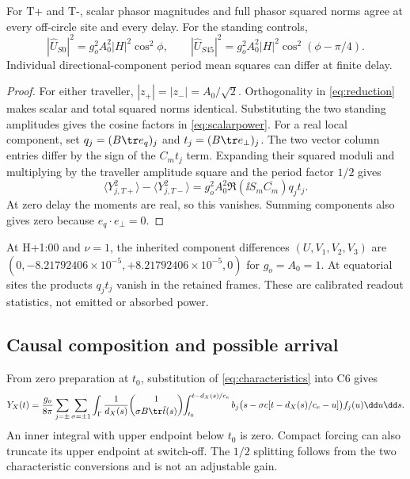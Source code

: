 \begin{proposition}\label{prop:power}
For T+ and T-, scalar phasor magnitudes and full phasor squared norms agree at every off-circle site and every delay. For the standing controls,
\begin{equation}\label{eq:scalarpower}
 |\widehat U_{S0}|^2=g_o^2A_0^2|H|^2\cos^2\phi,\qquad
 |\widehat U_{S45}|^2=g_o^2A_0^2|H|^2\cos^2(\phi-\pi/4).
\end{equation}
Individual directional-component period mean squares can differ at finite delay.
\end{proposition}
\begin{proof}
For either traveller, $|z_+|=|z_-|=A_0/\sqrt2$. Orthogonality in \eqref{eq:reduction} makes scalar and total squared norms identical. Substituting the two standing amplitudes gives the cosine factors in \eqref{eq:scalarpower}. For a real local component, set $q_j=(B\tr e_q)_j$ and $t_j=(B\tr e_\perp)_j$. The two vector column entries differ by the sign of the $C_mt_j$ term. Expanding their squared moduli and multiplying by the traveller amplitude square and the period factor $1/2$ gives
\begin{equation}\label{eq:componentpower}
 \langle Y_{j,T+}^2\rangle-\langle Y_{j,T-}^2\rangle
 =g_o^2A_0^2\Re(\ii S_m\overline{C_m})q_jt_j.
\end{equation}
At zero delay the moments are real, so this vanishes. Summing components also gives zero because $e_q\cdot e_\perp=0$.
\end{proof}
At H+1:00 and $\nu=1$, the inherited component differences $(U,V_1,V_2,V_3)$ are $(0,-8.21792406\times10^{-5},+8.21792406\times10^{-5},0)$ for $g_o=A_0=1$. At equatorial sites the products $q_jt_j$ vanish in the retained frames. These are calibrated readout statistics, not emitted or absorbed power.

\subsection{Causal composition and possible arrival}\label{sec:causality}
From zero preparation at $t_0$, substitution of \eqref{eq:characteristics} into C6 gives
\begin{equation}\label{eq:composition}
 \begin{split}
 Y_X(t)=\frac{g_o}{8\pi}\sum_{j=\pm}\sum_{\sigma=\pm1}
 \int_\Gamma\frac{1}{d_X(s)}\binom{1}{\sigma B\tr\hat t(s)}\hspace{-1mm}
 \int_{t_0}^{t-d_X(s)/c_e}
 b_j\big(s-\sigma c[t-d_X(s)/c_e-u]\big)f_j(u)\dd u\dd s .
 \end{split}
\end{equation}
An inner integral with upper endpoint below $t_0$ is zero. Compact forcing can also truncate its upper endpoint at switch-off. The $1/2$ splitting follows from the two characteristic conversions and is not an adjustable gain.

